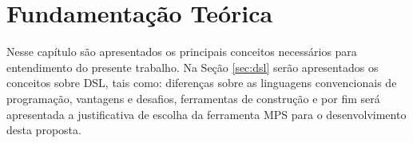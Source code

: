 \chapter{Fundamentação Teórica}
\label{chap:fundamentacao}

Nesse capítulo são apresentados os principais conceitos necessários para entendimento do presente trabalho. Na Seção \ref{sec:dsl} serão apresentados os conceitos sobre \gls{DSL}, tais como: diferenças sobre as linguagens convencionais de programação, vantagens e desafios, ferramentas de construção e por fim será apresentada a justificativa de escolha da ferramenta \gls{MPS} para o desenvolvimento desta proposta.




